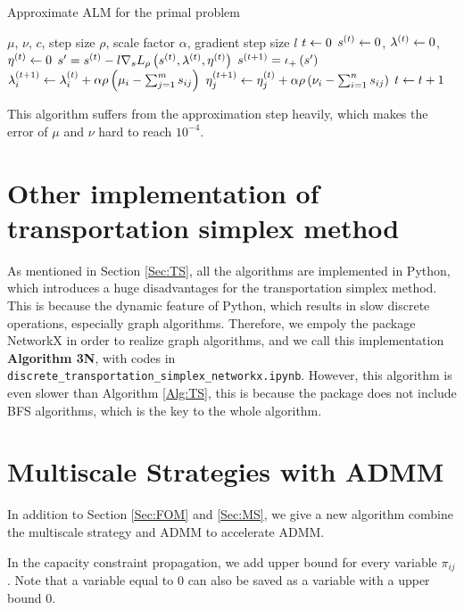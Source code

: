 \documentclass[english]{pkupaper}
\begin{document}
\begin{algorithm}
\caption{Approximate ALM for the primal problem}
\label{Alg:ApproxALM}
\begin{algorithmic}
\REQUIRE $\mu$, $\nu$, $c$, step size $\rho$, scale factor $\alpha$, gradient step size $l$
\STATE $ t \leftarrow 0 $
\STATE $ s^{\left( t \right)} \leftarrow 0 $, $ \lambda^{\left( t \right)} \leftarrow 0 $, $ \eta^{\left( t \right)} \leftarrow 0 $
\STATE $ s' = s^{\left( t \right)} - l \nabla_s L_{\rho} \left(  s^{\left( t \right)}, \lambda^{\left( t \right)}, \eta^{\left( t \right)}  \right) $
\STATE $ s^{\left(  t + 1  \right)} = \iota_+ \left( s' \right) $
\STATE $ \lambda^{\left(  t + 1  \right)}_i \leftarrow \lambda^{\left( t \right)}_i + \alpha \rho \left(  \mu_i - \sum_{ {j} = {1} }^{m}{s_{ i j }}  \right) $
\STATE $ \eta^{\left(  t + 1  \right)}_j \leftarrow \eta^{\left( t \right)}_j + \alpha \rho \left(  \nu_i - \sum_{ {i} = {1} }^{n}{s_{ i j }}  \right) $
\STATE $ t \leftarrow t + 1 $
\ENDWHILE
\end{algorithmic}
\end{algorithm}

This algorithm suffers from the approximation step heavily, which makes the error of $\mu$ and $\nu$ hard to reach $10^{-4}$.

\section{Other implementation of transportation simplex method}

As mentioned in Section \ref{Sec:TS}, all the algorithms are implemented in Python, which introduces a huge disadvantages for the transportation simplex method. This is because the dynamic feature of Python, which results in slow discrete operations, especially graph algorithms. Therefore, we empoly the package NetworkX in order to realize graph algorithms, and we call this implementation \textbf{Algorithm \hypertarget{EAlg:3N}{3N}}, with codes in \verb"discrete_transportation_simplex_networkx.ipynb". However, this algorithm is even slower than Algorithm \ref{Alg:TS}, this is because the package does not include BFS algorithms, which is the key to the whole algorithm.

\section{Multiscale Strategies with ADMM}

In addition to Section \ref{Sec:FOM} and \ref{Sec:MS}, we give a new algorithm combine the multiscale strategy and ADMM to accelerate ADMM.

In the capacity constraint propagation, we add upper bound for every variable $\pi_{ij}$. Note that a variable equal to $0$ can also be saved as a variable with a upper bound $0$.
\end{document}
